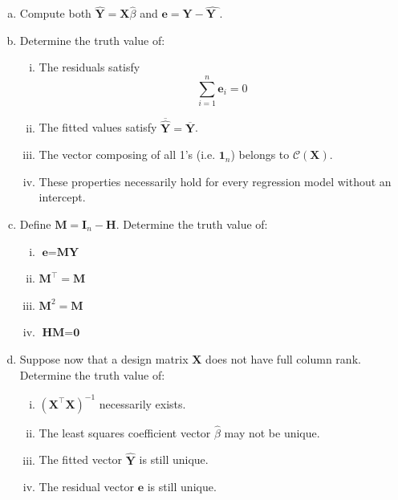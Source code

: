 \documentclass[12pt,letterpaper, onecolumn]{exam}
\begin{document}
\begin{questions}
    \begin{enumerate}[a.)]
        \item Compute both $\hat{\textbf{Y}}=\textbf{X}\hat{\beta}$ and $\textbf{e}=\textbf{Y}-\hat{\textbf{
       Y 
        }}$.
        \item Determine the truth value of:
        \begin{enumerate}[i.)]
            \item The residuals satisfy
            \begin{equation*}
                \sum\limits_{i=1}^{n}\textbf{e}_i=0
            \end{equation*}
            \item The fitted values satisfy $\overline{\hat{\textbf{Y}}}=\overline{\textbf{Y}}$.
            \item The vector composing of all 1's (i.e. $\textbf{1}_n$) belongs to $\mathcal{C}(\textbf{X}).$
            \item These properties necessarily hold for every regression model without an intercept.
        \end{enumerate}
        \item Define $\textbf{M}=\textbf{I}_n - \textbf{H}$. 
        Determine the truth value of:
        \begin{enumerate}[i.)]
            \item $\textbf{e}=\textbf{M}\textbf{Y}$
            \item $\textbf{M}^\intercal = \textbf{M}$
            \item $\textbf{M}^2 = \textbf{M}$
            \item $\textbf{HM}=\textbf{0}$
        \end{enumerate}
        \item Suppose now that a design matrix $\textbf{X}$ does not have full column rank.
        Determine the truth value of:
        \begin{enumerate}[i.)]
            \item $(\textbf{X}^\intercal\textbf{X})^{-1}$ necessarily exists.
            \item The least squares coefficient vector $\hat{\beta}$ may not be unique. 
            \item The fitted vector $\hat{\textbf{Y}}$ is still unique.
            \item The residual vector $\textbf{e}$ is still unique.
        \end{enumerate}
    \end{enumerate}


\end{questions}
\end{document}
